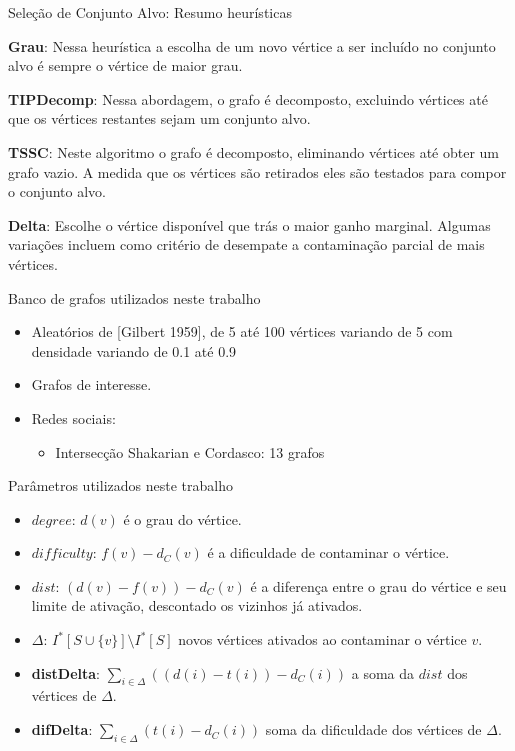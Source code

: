 \documentclass{beamer}
\begin{document}
\begin{frame}{Seleção de Conjunto Alvo: Resumo heurísticas}

\textbf{Grau}: Nessa heurística a escolha de um novo vértice a ser incluído no conjunto alvo é sempre o vértice de maior grau.

\textbf{TIPDecomp}: Nessa abordagem, o grafo é decomposto, excluindo
vértices até que os vértices restantes sejam um conjunto alvo.

\textbf{TSSC}: Neste algoritmo o grafo é decomposto, eliminando vértices
até obter um grafo vazio. A medida que os vértices são retirados eles
são testados para compor o conjunto alvo. 

\textbf{Delta}: Escolhe o vértice disponível que trás o maior ganho marginal. Algumas variações
incluem como critério de desempate a contaminação parcial de mais vértices.
\end{frame}

\begin{frame}{Banco de grafos utilizados neste trabalho}
\begin{itemize}
\tightlist
\item
  Aleatórios de {[}Gilbert 1959{]}, de 5 até 100 vértices variando de 5
  com densidade variando de 0.1 até 0.9
\item
  Grafos de interesse.
\item
  Redes sociais:

  \begin{itemize}
  \item
    Intersecção Shakarian e Cordasco: 13 grafos
  
  \end{itemize}
\end{itemize}
\end{frame}

\begin{frame}{Parâmetros utilizados neste trabalho}
\protect\hypertarget{paruxe2metros}{}
\begin{itemize}
\tightlist
\item
  \(degree\): \(d(v)\) é o grau do vértice.
\item
  \(difficulty\): \(f(v)-d_C(v)\) é a dificuldade de contaminar o
  vértice.
\item
  \(dist\): \((d(v)-f(v))-d_C(v)\) é a diferença entre o grau do vértice
  e seu limite de ativação, descontado os vizinhos já ativados.
\item
  \(\Delta\): \(I^*[S\cup\{v\}] \setminus I^*[S]\) novos vértices
  ativados ao contaminar o vértice \(v\).
\item
  {\bf distDelta}: \(\sum_{i\in \Delta}((d(i) - t(i))-d_C(i))\) a soma da
  \(dist\) dos vértices de \(\Delta\).
\item
  {\bf difDelta}: \(\sum_{i\in \Delta}(t(i)-d_C(i))\) soma da dificuldade
  dos vértices de \(\Delta\).
\end{itemize}
\end{frame}
\end{document}
